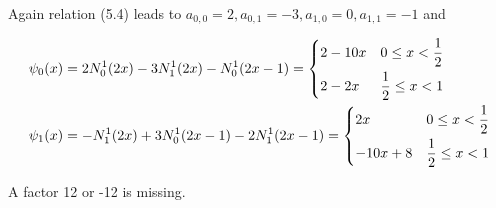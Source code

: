 \documentclass[a4paper, 11pt]{article}
\begin{document}
Again relation (5.4) leads to $a_{0,0} = 2, a_{0,1} = -3, a_{1,0}=0, a_{1,1} = -1$ and 

\begin{align*}
  \psi_0(x) &= 2N_0^1(2x) - 3N_1^1(2x) - N_0^1(2x-1) = \begin{dcases} 2 - 10x & 0 \leq x < \frac{1}{2} \\ 2 - 2x & 
  \frac{1}{2} \leq x < 1 \end{dcases} \\
  \psi_1(x) &= -N_1^1(2x) + 3N_0^1(2x-1) - 2N_1^1(2x-1) = \begin{dcases} 2x & 0 \leq x < \frac{1}{2} \\ -10x + 8 & 
  \frac{1}{2} \leq x < 1 \end{dcases} \\
\end{align*}

A factor 12 or -12 is missing.

\section*{}
\nocite{*}


\end{document}
